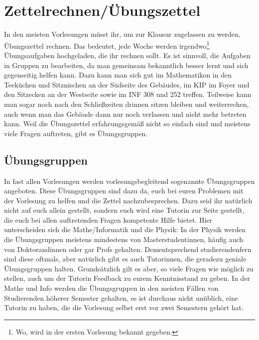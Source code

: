 
\section{Zettelrechnen/Übungszettel}
\label{uebungsgruppen}

\noindent In den meisten Vorlesungen müsst ihr, um zur Klausur zugelassen zu werden, Übungszettel rechnen. Das bedeutet, jede Woche werden irgendwo\footnote{Wo, wird in der ersten Vorlesung bekannt gegeben.} Übungsaufgaben hochgeladen, die ihr rechnen sollt. Es ist sinnvoll, die Aufgaben in Gruppen zu bearbeiten, da man gemeinsam bekanntlich besser lernt und sich gegenseitig helfen kann. Dazu kann man sich gut im Mathematikon in den Teeküchen und Sitznischen an der Südseite des Gebäudes, im \gls{KIP} im Foyer und den Sitzecken an der Westseite sowie im INF 308 und 252 treffen. Teilweise kann man sogar noch nach den Schließzeiten drinnen sitzen bleiben und weiterrechen, auch wenn man das Gebäude dann nur noch verlassen und nicht mehr betreten kann. Weil die Übungszettel erfahrungsgemäß nicht so einfach sind und meistens viele Fragen auftreten, gibt es Übungsgruppen.

\subsection{Übungsgruppen}
In fast allen Vorlesungen werden vorlesungsbegleitend sogenannte Übungsgruppen angeboten. Diese Übungsgruppen sind dazu da, euch bei euren Problemen mit der Vorlesung zu helfen und die Zettel nachzubesprechen. Dazu seid ihr natürlich nicht auf euch allein gestellt, sondern euch wird eine Tutorin zur Seite gestellt, die euch bei allen auftretenden Fragen kompetente Hilfe bietet. Hier unterscheiden sich die Mathe/Informatik und die Physik: In der Physik werden die Übungsgruppen meistens mindestens von Masterstudentinnen, häufig auch von Doktorandinnen oder gar Profs gehalten. Dementsprechend studierendenfern sind diese oftmals, aber natürlich gibt es auch Tutorinnen, die geradezu geniale Übungsgruppen halten. Grundsätzlich gilt es aber, so viele Fragen wie möglich zu stellen, auch um der Tutorin Feedback zu eurem Kenntnisstand zu geben. In der Mathe und Info werden die Übungsgruppen in den meisten Fällen von Studierenden höherer Semester gehalten, es ist durchaus nicht unüblich, eine Tutorin zu haben, die die Vorlesung selbst erst vor zwei Semestern gehört hat.

